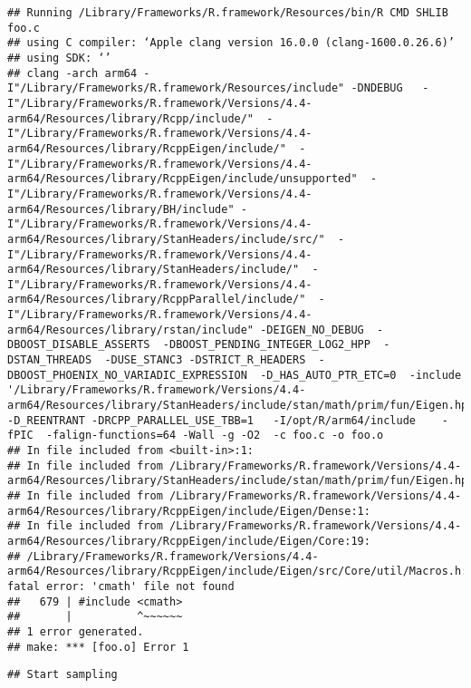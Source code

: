 \documentclass[
]{article}
\begin{document}
\begin{verbatim}
## Running /Library/Frameworks/R.framework/Resources/bin/R CMD SHLIB foo.c
## using C compiler: ‘Apple clang version 16.0.0 (clang-1600.0.26.6)’
## using SDK: ‘’
## clang -arch arm64 -I"/Library/Frameworks/R.framework/Resources/include" -DNDEBUG   -I"/Library/Frameworks/R.framework/Versions/4.4-arm64/Resources/library/Rcpp/include/"  -I"/Library/Frameworks/R.framework/Versions/4.4-arm64/Resources/library/RcppEigen/include/"  -I"/Library/Frameworks/R.framework/Versions/4.4-arm64/Resources/library/RcppEigen/include/unsupported"  -I"/Library/Frameworks/R.framework/Versions/4.4-arm64/Resources/library/BH/include" -I"/Library/Frameworks/R.framework/Versions/4.4-arm64/Resources/library/StanHeaders/include/src/"  -I"/Library/Frameworks/R.framework/Versions/4.4-arm64/Resources/library/StanHeaders/include/"  -I"/Library/Frameworks/R.framework/Versions/4.4-arm64/Resources/library/RcppParallel/include/"  -I"/Library/Frameworks/R.framework/Versions/4.4-arm64/Resources/library/rstan/include" -DEIGEN_NO_DEBUG  -DBOOST_DISABLE_ASSERTS  -DBOOST_PENDING_INTEGER_LOG2_HPP  -DSTAN_THREADS  -DUSE_STANC3 -DSTRICT_R_HEADERS  -DBOOST_PHOENIX_NO_VARIADIC_EXPRESSION  -D_HAS_AUTO_PTR_ETC=0  -include '/Library/Frameworks/R.framework/Versions/4.4-arm64/Resources/library/StanHeaders/include/stan/math/prim/fun/Eigen.hpp'  -D_REENTRANT -DRCPP_PARALLEL_USE_TBB=1   -I/opt/R/arm64/include    -fPIC  -falign-functions=64 -Wall -g -O2  -c foo.c -o foo.o
## In file included from <built-in>:1:
## In file included from /Library/Frameworks/R.framework/Versions/4.4-arm64/Resources/library/StanHeaders/include/stan/math/prim/fun/Eigen.hpp:22:
## In file included from /Library/Frameworks/R.framework/Versions/4.4-arm64/Resources/library/RcppEigen/include/Eigen/Dense:1:
## In file included from /Library/Frameworks/R.framework/Versions/4.4-arm64/Resources/library/RcppEigen/include/Eigen/Core:19:
## /Library/Frameworks/R.framework/Versions/4.4-arm64/Resources/library/RcppEigen/include/Eigen/src/Core/util/Macros.h:679:10: fatal error: 'cmath' file not found
##   679 | #include <cmath>
##       |          ^~~~~~~
## 1 error generated.
## make: *** [foo.o] Error 1
\end{verbatim}

\begin{verbatim}
## Start sampling
\end{verbatim}
\end{document}
